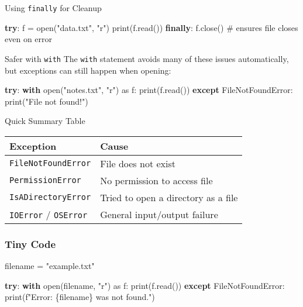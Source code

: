 \documentclass[
  letterpaper,
  DIV=11,
  numbers=noendperiod]{scrreprt}
\newenvironment{Shaded}{\begin{snugshade}}{\end{snugshade}}
\newcommand{\BuiltInTok}[1]{\textcolor[rgb]{0.00,0.23,0.31}{#1}}
\newcommand{\CommentTok}[1]{\textcolor[rgb]{0.37,0.37,0.37}{#1}}
\newcommand{\ControlFlowTok}[1]{\textcolor[rgb]{0.00,0.23,0.31}{\textbf{#1}}}
\newcommand{\ImportTok}[1]{\textcolor[rgb]{0.00,0.46,0.62}{#1}}
\newcommand{\NormalTok}[1]{\textcolor[rgb]{0.00,0.23,0.31}{#1}}
\newcommand{\OperatorTok}[1]{\textcolor[rgb]{0.37,0.37,0.37}{#1}}
\newcommand{\PreprocessorTok}[1]{\textcolor[rgb]{0.68,0.00,0.00}{#1}}
\newcommand{\SpecialCharTok}[1]{\textcolor[rgb]{0.37,0.37,0.37}{#1}}
\newcommand{\SpecialStringTok}[1]{\textcolor[rgb]{0.13,0.47,0.30}{#1}}
\newcommand{\StringTok}[1]{\textcolor[rgb]{0.13,0.47,0.30}{#1}}
\begin{document}
Using \texttt{finally} for Cleanup

\begin{Shaded}
\begin{Highlighting}[]
\ControlFlowTok{try}\NormalTok{:}
\NormalTok{    f }\OperatorTok{=} \BuiltInTok{open}\NormalTok{(}\StringTok{"data.txt"}\NormalTok{, }\StringTok{"r"}\NormalTok{)}
    \BuiltInTok{print}\NormalTok{(f.read())}
\ControlFlowTok{finally}\NormalTok{:}
\NormalTok{    f.close()   }\CommentTok{\# ensures file closes even on error}
\end{Highlighting}
\end{Shaded}

Safer with \texttt{with} The \texttt{with} statement avoids many of
these issues automatically, but exceptions can still happen when
opening:

\begin{Shaded}
\begin{Highlighting}[]
\ControlFlowTok{try}\NormalTok{:}
    \ControlFlowTok{with} \BuiltInTok{open}\NormalTok{(}\StringTok{"notes.txt"}\NormalTok{, }\StringTok{"r"}\NormalTok{) }\ImportTok{as}\NormalTok{ f:}
        \BuiltInTok{print}\NormalTok{(f.read())}
\ControlFlowTok{except} \PreprocessorTok{FileNotFoundError}\NormalTok{:}
    \BuiltInTok{print}\NormalTok{(}\StringTok{"File not found!"}\NormalTok{)}
\end{Highlighting}
\end{Shaded}

Quick Summary Table

\begin{longtable}[]{@{}ll@{}}
\toprule\noalign{}
Exception & Cause \\
\midrule\noalign{}
\endhead
\bottomrule\noalign{}
\endlastfoot
\texttt{FileNotFoundError} & File does not exist \\
\texttt{PermissionError} & No permission to access file \\
\texttt{IsADirectoryError} & Tried to open a directory as a file \\
\texttt{IOError} / \texttt{OSError} & General input/output failure \\
\end{longtable}

\subsubsection{Tiny Code}\label{tiny-code-58}

\begin{Shaded}
\begin{Highlighting}[]
\NormalTok{filename }\OperatorTok{=} \StringTok{"example.txt"}

\ControlFlowTok{try}\NormalTok{:}
    \ControlFlowTok{with} \BuiltInTok{open}\NormalTok{(filename, }\StringTok{"r"}\NormalTok{) }\ImportTok{as}\NormalTok{ f:}
        \BuiltInTok{print}\NormalTok{(f.read())}
\ControlFlowTok{except} \PreprocessorTok{FileNotFoundError}\NormalTok{:}
    \BuiltInTok{print}\NormalTok{(}\SpecialStringTok{f"Error: }\SpecialCharTok{\{}\NormalTok{filename}\SpecialCharTok{\}}\SpecialStringTok{ was not found."}\NormalTok{)}
\end{Highlighting}
\end{Shaded}
\end{document}
